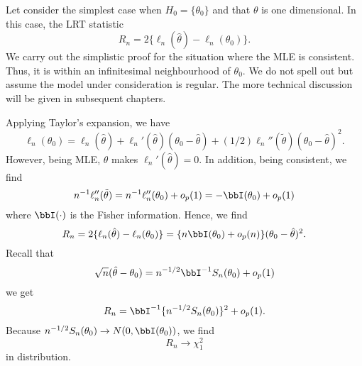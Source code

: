 Let consider the simplest case when $H_0 = \{ \theta_0 \}$
and that $\theta$ is one dimensional.
In this case, the LRT statistic
\[
R_n = 2 \{ \ell_n(\hat \theta) - \ell_n(\theta_0)\}.
\]
We carry out the simplistic proof for the
situation where the MLE is consistent.
Thus, it is within an infinitesimal neighbourhood of $\theta_0$.
We do not spell out but assume the model under consideration
is regular. The more technical discussion will be
given in subsequent chapters.

Applying Taylor's expansion, we have
\[
\ell_n(\theta_0) 
=  
\ell_n(\hat \theta) +  \ell_n'(\hat \theta)(\theta_0 - \hat \theta)
+ (1/2)  \ell_n''(\tilde \theta)(\theta_0 - \hat \theta)^2.
\]
However, being MLE, $\hat \theta$ makes 
$\ell_n'(\hat \theta) = 0$.
In addition, being consistent, we find
\[
n^{-1} \ell_n''(\tilde \theta)
=
n^{-1} \ell_n''(\theta_0) + o_p(1)
= - \bbI(\theta_0) + o_p(1)
\]
where $\bbI(\cdot)$ is the Fisher information.
Hence, we find
\[
R_n = 2 \{ \ell_n(\hat \theta) - \ell_n(\theta_0)\}
=
\{n \bbI(\theta_0) + o_p(n) \}(\theta_0 - \hat \theta)^2.
\]
Recall that
\[
\sqrt{n}(\hat \theta - \theta_0) 
= n^{-1/2} \bbI^{-1} S_n( \theta_0 )  + o_p(1)
\]
we get
\[
R_n
= \bbI^{-1} \{ n^{-1/2} S_n( \theta_0 ) \}^2  + o_p(1).
\]
Because $n^{-1/2} S_n( \theta_0 ) \to N(0, \bbI(\theta_0))$,
we find
\[
R_n \to \chi_1^2
\]
in distribution.

